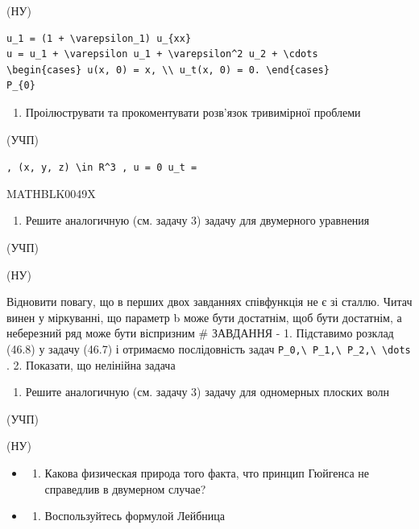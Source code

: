 \documentclass[
  ukrainian,
]{article}
\providecommand{\tightlist}{%
  \setlength{\itemsep}{0pt}\setlength{\parskip}{0pt}}
\begin{document}
(НУ)

\begin{verbatim}
u_1 = (1 + \varepsilon_1) u_{xx}
u = u_1 + \varepsilon u_1 + \varepsilon^2 u_2 + \cdots
\begin{cases} u(x, 0) = x, \\ u_t(x, 0) = 0. \end{cases}
P_{0}
\end{verbatim}

\begin{enumerate}
\def\labelenumi{\arabic{enumi}.}
\setcounter{enumi}{2}
\tightlist
\item
  Проілюструвати та прокоментувати розв'язок тривимірної проблеми
\end{enumerate}

(УЧП)

\texttt{,\ \textquotesingle{}(x,\ y,\ z)\ \textbackslash{}in\ R\^{}3\textquotesingle{}\ ,\ \textquotesingle{}u\ =\ 0\textquotesingle{}\ u\_t\ =}

MATHBLK0049X

\begin{enumerate}
\def\labelenumi{\arabic{enumi}.}
\setcounter{enumi}{3}
\tightlist
\item
  Решите аналогичную (см. задачу 3) задачу для двумерного уравнения
\end{enumerate}

(УЧП)

(НУ)

Відновити повагу, що в перших двох завданнях співфункція не є зі сталлю.
Читач винен у міркуванні, що параметр b може бути достатнім, щоб бути
достатнім, а неберезний ряд може бути віспризним \# ЗАВДАННЯ - 1.
Підставимо розклад (46.8) у задачу (46.7) і отримаємо послідовність
задач
\texttt{P\_0,\textbackslash{}\ P\_1,\textbackslash{}\ P\_2,\textbackslash{}\ \textbackslash{}dots}
. 2. Показати, що нелінійна задача

\begin{enumerate}
\def\labelenumi{\arabic{enumi}.}
\setcounter{enumi}{4}
\tightlist
\item
  Решите аналогичную (см. задачу 3) задачу для одномерных плоских волн
\end{enumerate}

(УЧП)

(НУ)

\begin{itemize}
\tightlist
\item
  \begin{enumerate}
  \def\labelenumi{\arabic{enumi}.}
  \setcounter{enumi}{5}
  \tightlist
  \item
    Какова физическая природа того факта, что принцип Гюйгенса не
    справедлив в двумерном случае?
  \end{enumerate}
\item
  \begin{enumerate}
  \def\labelenumi{\arabic{enumi}.}
  \setcounter{enumi}{6}
  \tightlist
  \item
    Воспользуйтесь формулой Лейбница
  \end{enumerate}
\end{itemize}
\end{document}
